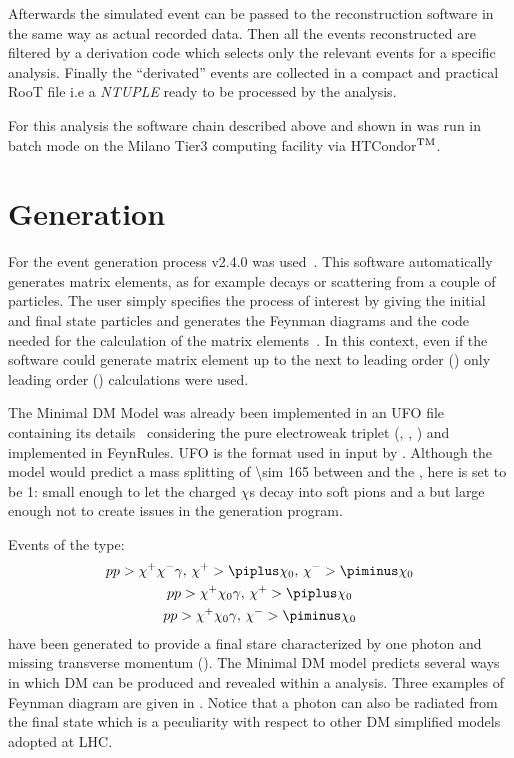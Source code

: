 Afterwards the simulated event can be passed to the reconstruction software in the same way as actual recorded data. Then all the events reconstructed are filtered by a derivation code which selects only the  relevant events for a specific analysis. Finally the ``derivated'' events are collected in a compact and practical RooT file i.e a \emph{NTUPLE} ready to be processed by the analysis.

For this analysis the software chain described above and shown in \Fig{\ref{fig:chain}} was run in batch mode on the Milano Tier3 computing facility via HTCondor$^{\textup{TM}}$.



\section{Generation}

For the event generation process \MGMCatNLO v2.4.0 was used~\cite{madgraph}. This software automatically generates matrix elements, as for example decays or scattering from a couple of particles. The user simply specifies the process of interest by giving the initial and final state particles and \MADGRAPH generates the Feynman diagrams and the code needed for the calculation of the matrix elements~\cite{Pottgen:2016807}. In this context, even if the software could generate matrix element up to the next to leading order (\NLO) only leading order (\LO) calculations were used.

The Minimal DM Model was already been implemented in an UFO file containing its details~\cite{mperego} considering the pure electroweak triplet (\chip\!, \chizero\!, \chim\!) and implemented in FeynRules. UFO is the format used in input by \MADGRAPH. Although the model would predict a mass splitting of \SI{\sim 165}{\mev} between \chipm and the \chizero, here is set to be \SI{1}{\gev}: small enough to let the charged $\chi$s decay into soft pions and a \chizero but large enough not to create issues in the generation program. 

Events of the type: 
\begin{gather*}
p p > \chi^+ \chi^- \gamma,\, \chi^+ > \piplus \chi_0,\, \chi^- > \piminus \chi_0\\
p p > \chi^+ \chi_0 \gamma,\, \chi^+ > \piplus \chi_0\\
p p > \chi^+ \chi_0 \gamma,\, \chi^- > \piminus \chi_0
\end{gather*}
have been generated to provide a final stare characterized by one photon and missing transverse momentum (\met). The Minimal DM model predicts several ways in which DM can be produced and revealed within a \mph analysis. Three examples of Feynman diagram are given in \Fig{\ref{fig:feynman}}. Notice that a photon can also be radiated from the final state which is a peculiarity with respect to other DM simplified models adopted at LHC.

